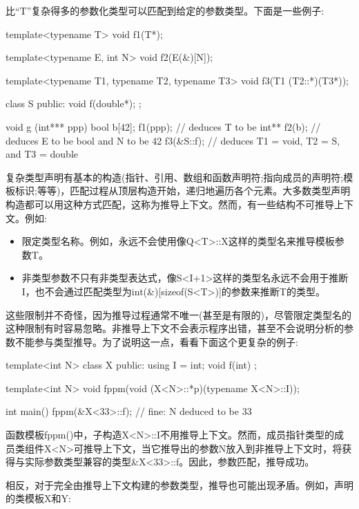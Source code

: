 比“T”复杂得多的参数化类型可以匹配到给定的参数类型。下面是一些例子:

\begin{cpp}
template<typename T>
void f1(T*);

template<typename E, int N>
void f2(E(&)[N]);

template<typename T1, typename T2, typename T3>
void f3(T1 (T2::*)(T3*));

class S {
	public:
	void f(double*);
};

void g (int*** ppp)
{
	bool b[42];
	f1(ppp); // deduces T to be int**
	f2(b); // deduces E to be bool and N to be 42
	f3(&S::f); // deduces T1 = void, T2 = S, and T3 = double
}
\end{cpp} 

复杂类型声明有基本的构造(指针、引用、数组和函数声明符;指向成员的声明符;模板标识;等等)，匹配过程从顶层构造开始，递归地遍历各个元素。大多数类型声明构造都可以用这种方式匹配，这称为推导上下文。然而，有一些结构不可推导上下文。例如:

\begin{itemize}
\item 
限定类型名称。例如，永远不会使用像Q<T>::X这样的类型名来推导模板参数T。

\item 
非类型参数不只有非类型表达式，像S<I+1>这样的类型名永远不会用于推断I，也不会通过匹配类型为int(\&)[sizeof(S<T>)]的参数来推断T的类型。
\end{itemize}

这些限制并不奇怪，因为推导过程通常不唯一(甚至是有限的)，尽管限定类型名的这种限制有时容易忽略。非推导上下文不会表示程序出错，甚至不会说明分析的参数不能参与类型推导。为了说明这一点，看看下面这个更复杂的例子:

\begin{cpp}
template<int N>
class X {
	public:
	using I = int;
	void f(int) {
	}
};

template<int N>
void fppm(void (X<N>::*p)(typename X<N>::I));

int main()
{
	fppm(&X<33>::f); // fine: N deduced to be 33
}
\end{cpp}

函数模板fppm()中，子构造X<N>::I不用推导上下文。然而，成员指针类型的成员类组件X<N>可推导上下文，当它推导出的参数N放入到非推导上下文时，将获得与实际参数类型兼容的类型\&X<33>::f。因此，参数匹配，推导成功。

相反，对于完全由推导上下文构建的参数类型，推导也可能出现矛盾。例如，声明的类模板X和Y:

